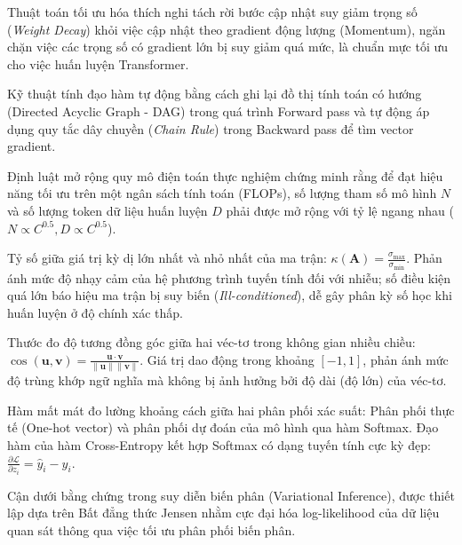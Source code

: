 \begin{description}[leftmargin=2.5cm, style=nextline]
  \item[\term{AdamW (Decoupled Weight Decay)}] Thuật toán tối ưu hóa thích nghi tách rời bước cập nhật suy giảm trọng số (\textit{Weight Decay}) khỏi việc cập nhật theo gradient động lượng (Momentum), ngăn chặn việc các trọng số có gradient lớn bị suy giảm quá mức, là chuẩn mực tối ưu cho việc huấn luyện Transformer.

  \item[\term{Autograd (Automatic Differentiation)}] Kỹ thuật tính đạo hàm tự động bằng cách ghi lại đồ thị tính toán có hướng (Directed Acyclic Graph - DAG) trong quá trình Forward pass và tự động áp dụng quy tắc dây chuyền (\textit{Chain Rule}) trong Backward pass để tìm vector gradient.

  \item[\term{Chinchilla Scaling Laws}] Định luật mở rộng quy mô điện toán thực nghiệm chứng minh rằng để đạt hiệu năng tối ưu trên một ngân sách tính toán (FLOPs), số lượng tham số mô hình $N$ và số lượng token dữ liệu huấn luyện $D$ phải được mở rộng với tỷ lệ ngang nhau ($N \propto C^{0.5}, D \propto C^{0.5}$).

  \item[\term{Condition Number (Số Điều Kiện)}] Tỷ số giữa giá trị kỳ dị lớn nhất và nhỏ nhất của ma trận: $\kappa(\mathbf{A}) = \frac{\sigma_{\max}}{\sigma_{\min}}$. Phản ánh mức độ nhạy cảm của hệ phương trình tuyến tính đối với nhiễu; số điều kiện quá lớn báo hiệu ma trận bị suy biến (\textit{Ill-conditioned}), dễ gây phân kỳ số học khi huấn luyện ở độ chính xác thấp.

  \item[\term{Cosine Similarity}] Thước đo độ tương đồng góc giữa hai véc-tơ trong không gian nhiều chiều: $\cos(\mathbf{u}, \mathbf{v}) = \frac{\mathbf{u} \cdot \mathbf{v}}{\|\mathbf{u}\| \|\mathbf{v}\|}$. Giá trị dao động trong khoảng $[-1, 1]$, phản ánh mức độ trùng khớp ngữ nghĩa mà không bị ảnh hưởng bởi độ dài (độ lớn) của véc-tơ.

  \item[\term{Cross-Entropy Loss}] Hàm mất mát đo lường khoảng cách giữa hai phân phối xác suất: Phân phối thực tế (One-hot vector) và phân phối dự đoán của mô hình qua hàm Softmax. Đạo hàm của hàm Cross-Entropy kết hợp Softmax có dạng tuyến tính cực kỳ đẹp: $\frac{\partial \mathcal{L}}{\partial z_i} = \hat{y}_i - y_i$.

  \item[\term{ELBO (Evidence Lower Bound)}] Cận dưới bằng chứng trong suy diễn biến phân (Variational Inference), được thiết lập dựa trên Bất đẳng thức Jensen nhằm cực đại hóa log-likelihood của dữ liệu quan sát thông qua việc tối ưu phân phối biến phân.


\end{description}
